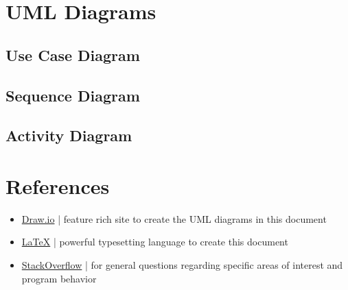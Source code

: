 \documentclass[12pt]{article}
\begin{document}
\section{UML Diagrams}

\subsection{Use Case Diagram}


\subsection{Sequence Diagram}


\subsection{Activity Diagram}

\newpage

\section{References}

\begin{itemize}
\item \href{https://app.diagrams.net/}{Draw.io} | feature rich site to create the UML diagrams in this document
\item \href{https://www.latex-project.org/}{\LaTeX} | powerful typesetting language to create this document
\item \href{https://stackoverflow.com/}{StackOverflow} | for general questions regarding specific areas of interest and program behavior
\end{itemize}
\end{document}
